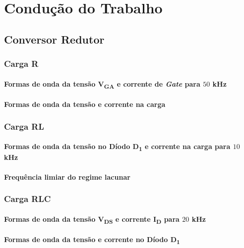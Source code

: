 \documentclass[a4paper,11pt]{article}
\numberwithin{equation}{section}
\begin{document}
\section{Condução do Trabalho}

\subsection{Conversor Redutor}

\subsubsection{Carga R}

\paragraph{Formas de onda da tensão V\textsubscript{GA} e corrente de \textit{Gate} para $50$ kHz}

\paragraph{Formas de onda da tensão e corrente na carga}

\subsubsection{Carga RL}

\paragraph{Formas de onda da tensão no Díodo D\textsubscript{1} e corrente na carga para $10$ kHz}

\paragraph{Frequência limiar do regime lacunar}

\subsubsection{Carga RLC}

\paragraph{Formas de onda da tensão V\textsubscript{DS} e corrente I\textsubscript{D} para $20$ kHz}

\paragraph{Formas de onda da tensão e corrente no Díodo D\textsubscript{1}}
\end{document}
